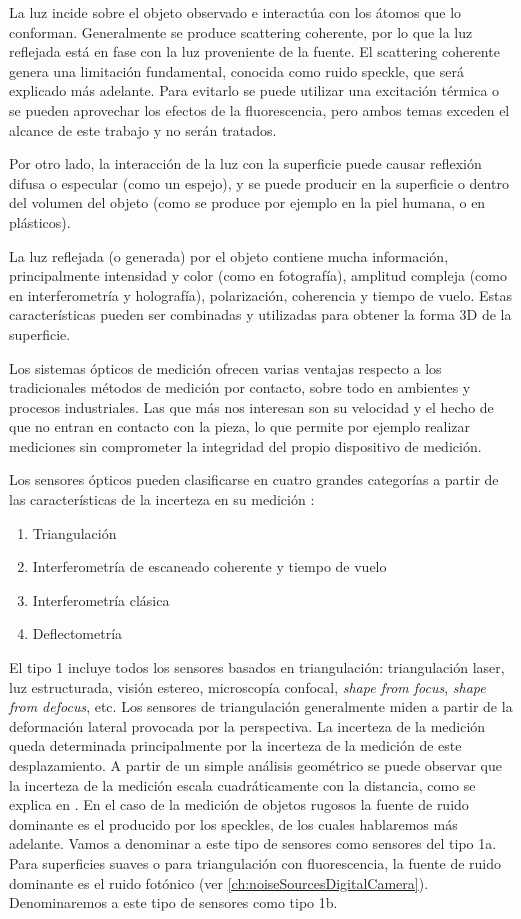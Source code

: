 La luz incide sobre el objeto observado e interactúa con los átomos que lo conforman. Generalmente se produce scattering coherente, por lo que la luz reflejada está en fase con la luz proveniente de la fuente. El scattering coherente genera una limitación fundamental, conocida como ruido speckle, que será explicado más adelante. Para evitarlo se puede utilizar una excitación térmica o se pueden aprovechar los efectos de la fluorescencia, pero ambos temas exceden el alcance de este trabajo y no serán tratados.

Por otro lado, la interacción de la luz con la superficie puede causar reflexión difusa o especular (como un espejo), y se puede producir en la superficie o dentro del volumen del objeto (como se produce por ejemplo en la piel humana, o en plásticos).

La luz reflejada (o generada) por el objeto contiene mucha información, principalmente intensidad y color (como en fotografía), amplitud compleja (como en interferometría y holografía), polarización, coherencia y tiempo de vuelo. Estas características pueden ser combinadas y utilizadas para obtener la forma 3D de la superficie.

Los sistemas ópticos de medición ofrecen varias ventajas respecto a los tradicionales métodos de medición por contacto, sobre todo en ambientes y procesos industriales. Las que más nos interesan son su velocidad y el hecho de que no entran en contacto con la pieza, lo que permite por ejemplo realizar mediciones sin comprometer la integridad del propio dispositivo de medición.

Los sensores ópticos pueden clasificarse en cuatro grandes categorías a partir de las características de la incerteza en su medición \cite{hausler2011limitations}:
\begin{enumerate}
    \item Triangulación
    \item Interferometría de escaneado coherente y tiempo de vuelo
    \item Interferometría clásica
    \item Deflectometría
\end{enumerate}

El tipo 1 incluye todos los sensores basados en triangulación: triangulación laser, luz estructurada, visión estereo, microscopía confocal, \emph{shape from focus}, \emph{shape from defocus}, etc. Los sensores de triangulación generalmente miden a partir de la deformación lateral provocada por la perspectiva. La incerteza de la medición queda determinada principalmente por la incerteza de la medición de este desplazamiento. A partir de un simple análisis geométrico se puede observar que la incerteza de la medición escala cuadráticamente con la distancia, como se explica en \cite{khoshelham2012accuracy}. En el caso de la medición de objetos rugosos la fuente de ruido dominante es el producido por los speckles, de los cuales hablaremos más adelante. Vamos a denominar a este tipo de sensores como sensores del tipo 1a. Para superficies suaves o para triangulación con fluorescencia, la fuente de ruido dominante es el ruido fotónico (ver \autoref{ch:noiseSourcesDigitalCamera}). Denominaremos a este tipo de sensores como tipo 1b.

